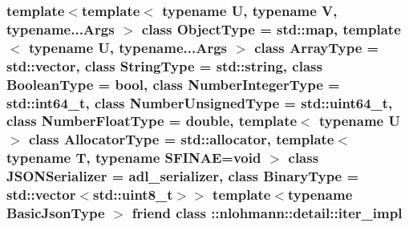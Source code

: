 \subsubsection[{\texorpdfstring{\+::nlohmann\+::detail\+::iter\+\_\+impl}{::nlohmann::detail::iter_impl}}]{\setlength{\rightskip}{0pt plus 5cm}template$<$template$<$ typename U, typename V, typename...\+Args $>$ class Object\+Type = std\+::map, template$<$ typename U, typename...\+Args $>$ class Array\+Type = std\+::vector, class String\+Type  = std\+::string, class Boolean\+Type  = bool, class Number\+Integer\+Type  = std\+::int64\+\_\+t, class Number\+Unsigned\+Type  = std\+::uint64\+\_\+t, class Number\+Float\+Type  = double, template$<$ typename U $>$ class Allocator\+Type = std\+::allocator, template$<$ typename T, typename S\+F\+I\+N\+A\+E=void $>$ class J\+S\+O\+N\+Serializer = adl\+\_\+serializer, class Binary\+Type  = std\+::vector$<$std\+::uint8\+\_\+t$>$$>$ template$<$typename Basic\+Json\+Type $>$ friend class \+::{\bf nlohmann\+::detail\+::iter\+\_\+impl}\hspace{0.3cm}{\ttfamily [friend]}}\hypertarget{classnlohmann_1_1basic__json_a842e5c7ca096025c18b11e715d3401f4}{}\label{classnlohmann_1_1basic__json_a842e5c7ca096025c18b11e715d3401f4}

